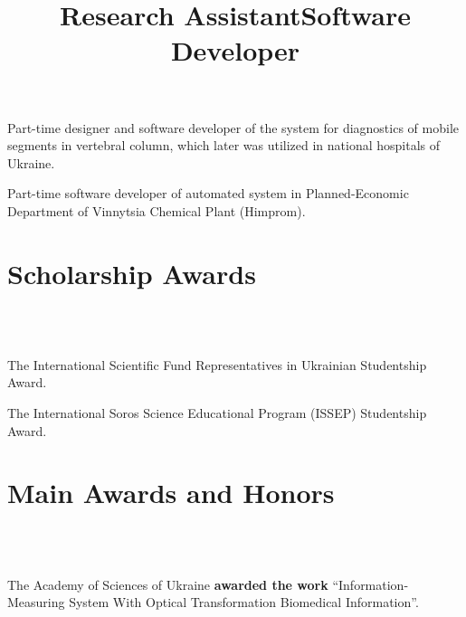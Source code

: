 \documentclass[10pt,overlapped,line]{res}
\newcommand{\mplace}[1]{\textbf{#1}}
\begin{document}
\begin{resume}
 \title{Research Assistant}
 \begin{position}
 Part-time designer and software developer of the system for
 diagnostics of mobile segments in vertebral column, which later was
 utilized in national hospitals of Ukraine.
 \end{position}

 \title{Software Developer}
 \begin{position}
 Part-time software developer of automated system in
 Planned-Economic Department of Vinnytsia Chemical Plant (Himprom).
 \end{position}

 \section{Scholarship Awards}
 \begin{format}
   \\
   \body\\
 \end{format}

 \employer{}
 \begin{position}
  The International Scientific Fund Representatives in Ukrainian Studentship Award.
 \end{position}

 \employer{}
 \begin{position}
  The International Soros Science Educational Program (ISSEP) Studentship Award.
 \end{position}


 \section{Main Awards and Honors}
 \begin{format}
    \\
   \body\\
 \end{format}

 \begin{position}
   The Academy of Sciences of Ukraine \mplace{awarded the work}
   ``Information-Measuring System With Optical Transformation
   Biomedical Information''.
 \end{position}


\end{resume}
\end{document}
